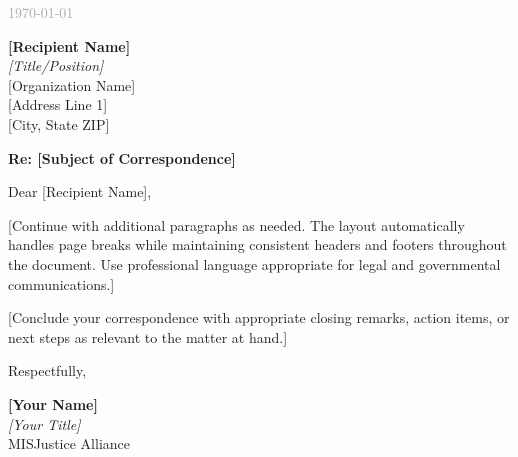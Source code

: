 \documentclass[11pt, letterpaper]{article}
\begin{document}
\thispagestyle{firstpage}

\vspace{0.25in}
\noindent
\textcolor{DarkGray}{\today}

\vspace{0.4in}

\noindent
\textbf{[Recipient Name]}\\
\textit{[Title/Position]}\\
{[Organization Name]}\\
{[Address Line 1]}\\
{[City, State ZIP]}

\vspace{0.35in}

\noindent
\textcolor{NavyBlue}{\textbf{Re: [Subject of Correspondence]}}

\vspace{0.25in}

\noindent
Dear [Recipient Name],

\vspace{0.15in}


[Continue with additional paragraphs as needed. The layout automatically handles page breaks while maintaining consistent headers and footers throughout the document. Use professional language appropriate for legal and governmental communications.]

[Conclude your correspondence with appropriate closing remarks, action items, or next steps as relevant to the matter at hand.]

\vspace{0.4in}

\noindent
Respectfully,

\vspace{0.6in}

\noindent
\textbf{[Your Name]}\\
\textit{[Your Title]}\\
MISJustice Alliance

\vspace{0.25in}

%
%
%
\end{document}
